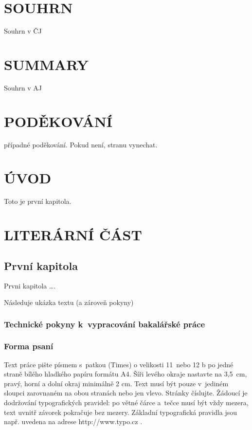 \documentclass[a4paper, 12pt]{article}
\begin{document}
%
%
\section*{SOUHRN}

Souhrn v ČJ

\section*{SUMMARY}
Souhrn v AJ

%
%
\newpage
\section*{PODĚKOVÁNÍ}
případné poděkování. Pokud není, stranu vynechat.


\tableofcontents
\newpage

\section{ÚVOD}
Toto je první kapitola.

\newpage
\section{LITERÁRNÍ ČÁST}

\subsection{První kapitola}
Prvni kapitola \ldots.

Následuje ukázka textu (a zároveň pokyny)
\subsubsection{Technické pokyny k~vypracování bakalářské práce}
\subsubsection*{Forma psaní}
Text práce pište písmem s~patkou (Times) o velikosti 11~nebo 12 b po jedné straně bílého hladkého papíru formátu A4. Šíři levého okraje nastavte na 3,5~cm, pravý, horní a dolní okraj minimálně 2 cm. Text musí být pouze v~jediném sloupci zarovnaném na obou stranách nebo jen vlevo. Stránky číslujte. Žádoucí je dodržování typografických pravidel: po větné čárce a~tečce musí být vždy mezera, text uvnitř závorek pokračuje bez mezery. Základní typografická pravidla jsou např. uvedena na adrese http://www.typo.cz .
\end{document}

